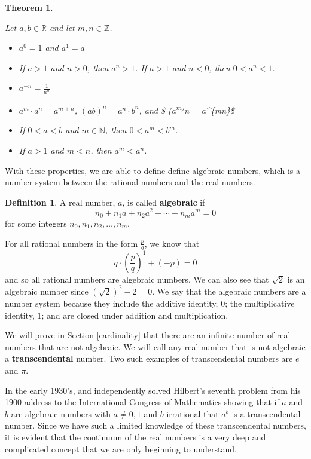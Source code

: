 \documentclass[
]{book}
\newtheorem{theorem}{Theorem}[chapter]
\theoremstyle{definition}
\newtheorem{definition}{Definition}[chapter]
\theoremstyle{definition}
\theoremstyle{definition}
\theoremstyle{definition}
\theoremstyle{remark}
\begin{document}
\begin{theorem}
\protect\hypertarget{thm:exponents-real-integers}{}\label{thm:exponents-real-integers}

Let \(a,b \in \mathbb{R}\) and let \(m,n\in \mathbb{Z}\).

\begin{itemize}
\item
  \(a^0=1\) and \(a^1=a\)
\item
  If \(a>1\) and \(n>0\), then \(a^n >1\). If \(a>1\) and \(n<0\), then \(0<a^n<1\).
\item
  \(a^{-n} = \frac{1}{a^n}\)
\item
  \(a^m\cdot a^n = a^{m+n}\), \((ab)^n=a^n\cdot b^n\), and \$ (a\textsuperscript{m)}n = a\^{}\{mn\}\$
\item
  If \(0<a<b\) and \(m\in \mathbb{N}\), then \(0<a^m<b^m\).
\item
  If \(a>1\) and \(m<n\), then \(a^m<a^n\).
\end{itemize}

\end{theorem}

With these properties, we are able to define define algebraic numbers, which is a number system between the rational numbers and the real numbers.

\begin{definition}
\protect\hypertarget{def:algebraic-numbers}{}\label{def:algebraic-numbers}A real number, \(a\), is called \textbf{algebraic} if \[n_0 + n_1 a + n_2 a^2 + \cdots + n_m a^m =0\] for some integers \(n_0, n_1, n_2, \ldots, n_m\).
\end{definition}

For all rational numbers in the form \(\frac{p}{q}\), we know that \[q \cdot \left(\frac{p}{q}\right)^1 + (-p) = 0\] and so all rational numbers are algebraic numbers. We can also see that \(\sqrt{2}\) is an algebraic number since \((\sqrt{2})^2-2=0\). We say that the algebraic numbers are a number system because they include the additive identity, \(0\); the multiplicative identity, \(1\); and are closed under addition and multiplication.

We will prove in Section \ref{cardinality} that there are an infinite number of real numbers that are not algebraic. We will call any real number that is not algebraic a \textbf{transcendental} number. Two such examples of transcendental numbers are \(e\) and \(\pi\).

In the early 1930's, \citet{Gelfond} and \citet{Schneider} independently solved Hilbert's seventh problem from his 1900 address to the International Congress of Mathematics showing that if \(a\) and \(b\) are algebraic numbers with \(a\neq 0,1\) and \(b\) irrational that \(a^b\) is a transcendental number. Since we have such a limited knowledge of these transcendental numbers, it is evident that the continuum of the real numbers is a very deep and complicated concept that we are only beginning to understand.
\end{document}
